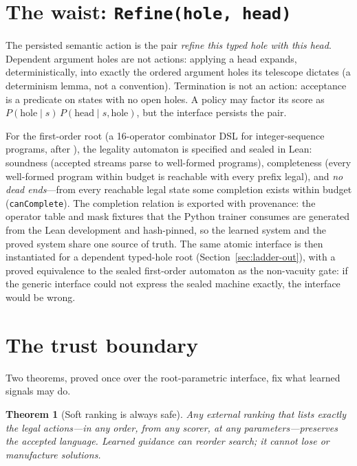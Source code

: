 \documentclass[11pt]{article}
\newcommand{\code}[1]{\texttt{#1}}
\newtheorem{theorem}{Theorem}
\begin{document}
\section{The waist: \code{Refine(hole, head)}}
\label{sec:waist}

The persisted semantic action is the pair \emph{refine this typed hole with this head}.
Dependent argument holes are not actions: applying a head expands, deterministically,
into exactly the ordered argument holes its telescope dictates (a determinism lemma,
not a convention). Termination is not an action: acceptance is a predicate on states
with no open holes. A policy may factor its score as
$P(\text{hole}\mid s)\,P(\text{head}\mid s,\text{hole})$, but the interface persists
the pair.

For the first-order root (a 16-operator combinator DSL for integer-sequence programs,
after \cite{gauthier2023}), the legality automaton is specified and sealed in Lean:
soundness (accepted streams parse to well-formed programs), completeness (every
well-formed program within budget is reachable with every prefix legal), and
\emph{no dead ends}---from every reachable legal state some completion exists within
budget (\code{canComplete}). The completion relation is exported with provenance: the
operator table and mask fixtures that the Python trainer consumes are generated from
the Lean development and hash-pinned, so the learned system and the proved system share
one source of truth. The same atomic interface is then instantiated for a dependent
typed-hole root (Section~\ref{sec:ladder-out}), with a proved equivalence to the sealed
first-order automaton as the non-vacuity gate: if the generic interface could not
express the sealed machine exactly, the interface would be wrong.

\section{The trust boundary}
\label{sec:trust}

Two theorems, proved once over the root-parametric interface, fix what learned signals
may do.

\begin{theorem}[Soft ranking is always safe]
Any external ranking that lists exactly the legal actions---in any order, from any
scorer, at any parameters---preserves the accepted language. Learned guidance can
reorder search; it cannot lose or manufacture solutions.
\end{theorem}
\end{document}
